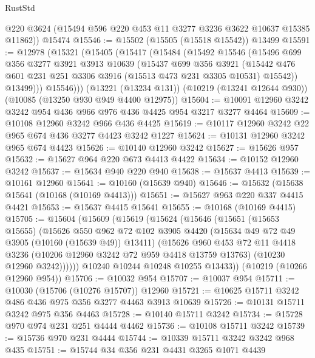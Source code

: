 \begin{lexlean}{RustStd}
\begin{coremodule}
      @220
      @3624
      (@15494 @596 @220 @453 @11 @3277 @3236 @3622 @10637 @15385 @11862))
    @15474
@15546 := @15502 (@15505 (@15518 @15542)) @13499
@15591 := @12978
    (@15321
      (@15405
        (@15417
          (@15484
            (@15492
              @15546
              (@15496
                @699
                @356
                @3277
                @3921
                @3913
                @10639
                (@15437
                  @699
                  @356
                  @3921
                  (@15442 @476 @601 @231 @251 @3306 @3916 (@15513 @473 @231 @3305 @10531) @15542))
                @13499)))
          @15546)))
    (@13221 (@13234 @131))
    (@10219 (@13241 @12644 @930))
    (@10085 (@13250 @930 @949 @4400 @12975))
@15604 := @10091 @12960 @3242 @3242 @954 @436 @966 @976 @436 @4425 @954 @3217 @3277 @4464
@15609 := @10108 @12960 @3242 @966 @436 @4425
@15619 := @10117 @12960 @3242 @22 @965 @674 @436 @3277 @4423 @3242 @1227
@15624 := @10131 @12960 @3242 @965 @674 @4423
@15626 := @10140 @12960 @3242
@15627 := @15626 @957
@15632 := @15627 @964 @220 @673 @4413 @4422
@15634 := @10152 @12960 @3242
@15637 := @15634 @940 @220 @940
@15638 := @15637 @4413
@15639 := @10161 @12960
@15641 := @10160 (@15639 @940)
@15646 := @15632 (@15638 @15641 (@10168 (@10169 @4413)))
@15651 := @15627 @963 @220 @337 @4415 @4421
@15653 := @15637 @4415 @15641
@15655 := @10168 (@10169 @4415)
@15705 := @15604
    (@15609
      (@15619
        (@15624
          (@15646
            (@15651
              (@15653 @15655)
              (@15626
                @550
                @962
                @72
                @102
                @3905
                @4420
                (@15634 @49 @72 @49 @3905 (@10160 (@15639 @49)) @13411)
                (@15626
                  @960
                  @453
                  @72
                  @11
                  @4418
                  @3236
                  (@10206 @12960 @3242 @72 @959 @4418 @13759 @13763)
                  (@10230 @12960 @3242))))))
        @10240
        @10244
        @10248
        @10255
        @13433))
    (@10219 (@10266 @12960 @954))
@15706 := @10032 @954
@15707 := @10037 @954
@15711 := @10030 (@15706 (@10276 @15707)) @12960
@15721 := @10625 @15711 @3242 @486 @436 @975 @356 @3277 @4463 @3913 @10639
@15726 := @10131 @15711 @3242 @975 @356 @4463
@15728 := @10140 @15711 @3242
@15734 := @15728 @970 @974 @231 @251 @4444 @4462
@15736 := @10108 @15711 @3242
@15739 := @15736 @970 @231 @4444
@15744 := @10339 @15711 @3242 @3242 @968 @435
@15751 := @15744 @34 @356 @231 @4431 @3265 @1071 @4439

\end{coremodule}
\end{lexlean}
